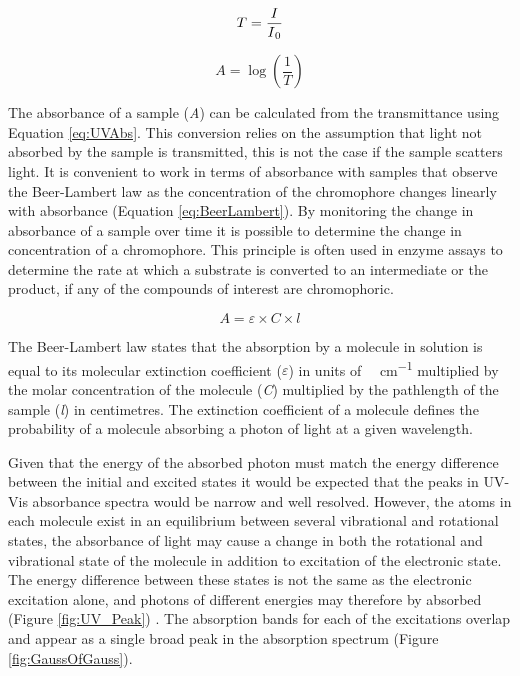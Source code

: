 \begin{equation}\label{eq:UVTransmittance}
T = \frac{I}{I\textsubscript{0}} 
\end{equation}

\begin{equation}\label{eq:UVAbs}
A = \log \left(\frac{1}{\textit{T}}\right)  
\end{equation}  

The absorbance of a sample (\textit{A}) can be calculated from the transmittance using Equation \ref{eq:UVAbs}. This conversion relies on the assumption that light not absorbed by the sample is transmitted, this is not the case if the sample scatters light. It is convenient to work in terms of absorbance with samples that observe the Beer-Lambert law as the concentration of the chromophore changes linearly with absorbance (Equation \ref{eq:BeerLambert}). By monitoring the change in absorbance of a sample over time it is possible to determine the change in concentration of a chromophore. This principle is often used in enzyme assays to determine the rate at which a substrate is converted to an intermediate or the product, if any of the compounds of interest are chromophoric.          
 
\begin{equation}\label{eq:BeerLambert}
A = \varepsilon \times \textit{C} \times \textit{l}
\end{equation}

The Beer-Lambert law states that the absorption by a molecule in solution is equal to its molecular extinction coefficient ($\varepsilon$) in units of \si{\per\molar\per\centi\meter} multiplied by the molar concentration of the molecule (\textit{C}) multiplied by the pathlength of the sample (\textit{l}) in centimetres. The extinction coefficient of a molecule defines the probability of a molecule absorbing a photon of light at a given wavelength. 

Given that the energy of the absorbed photon must match the energy difference between the initial and excited states it would be expected that the peaks in UV-Vis absorbance spectra would be narrow and well resolved. However, the atoms in each molecule exist in an equilibrium between several vibrational and rotational states, the absorbance of light may cause a change in both the rotational and vibrational state of the molecule in addition to excitation of the electronic state. The energy difference between these states is not the same as the electronic excitation alone, and photons of different energies may therefore by absorbed (Figure \ref{fig:UV_Peak}) \cite{Saleh2001}. The absorption bands for each of the excitations overlap and appear as a single broad peak in the absorption spectrum (Figure \ref{fig:GaussOfGauss}). 

